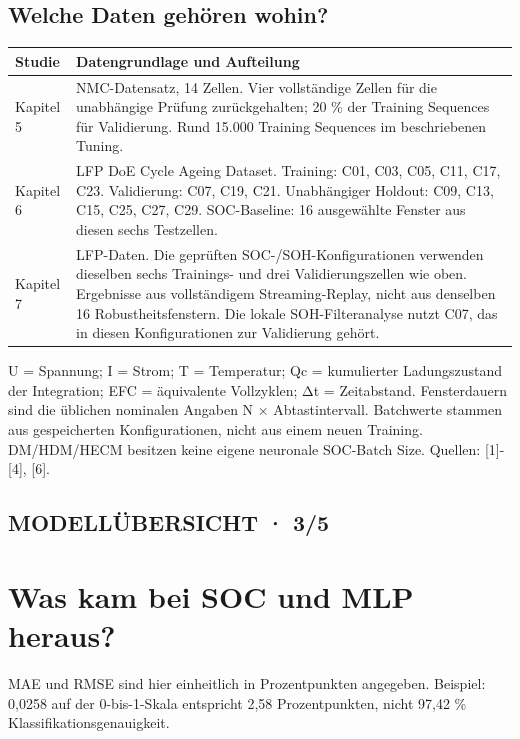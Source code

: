 \documentclass[11pt,a4paper]{article}
\begin{document}
\subsection*{Welche Daten gehören wohin?}
{\fontsize{9.5}{12}\selectfont\setlength{\tabcolsep}{2mm}\renewcommand{\arraystretch}{1.2}\begin{longtable}{>{\raggedright\arraybackslash}p{26.84mm}>{\raggedright\arraybackslash}p{135.16mm}}
\toprule
\textbf{Studie} & \textbf{Datengrundlage und Aufteilung} \\
\midrule\endhead
Kapitel 5 & NMC-Datensatz, 14 Zellen. Vier vollständige Zellen für die unabhängige Prüfung zurückgehalten; 20 \% der Training Sequences für Validierung. Rund 15.000 Training Sequences im beschriebenen Tuning. \\
Kapitel 6 & LFP DoE Cycle Ageing Dataset. Training: C01, C03, C05, C11, C17, C23. Validierung: C07, C19, C21. Unabhängiger Holdout: C09, C13, C15, C25, C27, C29. SOC-Baseline: 16 ausgewählte Fenster aus diesen sechs Testzellen. \\
Kapitel 7 & LFP-Daten. Die geprüften SOC-/\allowbreak{}SOH-Konfigurationen verwenden dieselben sechs Trainings- und drei Validierungszellen wie oben. Ergebnisse aus vollständigem Streaming-Replay, nicht aus denselben 16 Robustheitsfenstern. Die lokale SOH-Filteranalyse nutzt C07, das in diesen Konfigurationen zur Validierung gehört. \\
\bottomrule
\end{longtable}}
U = Spannung; I = Strom; T = Temperatur; Qc = kumulierter Ladungszustand der Integration; EFC = äquivalente Vollzyklen; Δt = Zeitabstand. Fensterdauern sind die üblichen nominalen Angaben N × Abtastintervall. Batchwerte stammen aus gespeicherten Konfigurationen, nicht aus einem neuen Training. DM/\allowbreak{}HDM/\allowbreak{}HECM besitzen keine eigene neuronale SOC-Batch Size. Quellen: [1]-[4], [6].


\clearpage
\subsection*{MODELLÜBERSICHT · 3/\allowbreak{}5}
\section*{\color{accent}Was kam bei SOC und MLP heraus?}
MAE und RMSE sind hier einheitlich in Prozentpunkten angegeben. Beispiel: 0,0258 auf der 0-bis-1-Skala entspricht 2,58 Prozentpunkten, nicht 97,42 \% Klassifikationsgenauigkeit.
\end{document}
